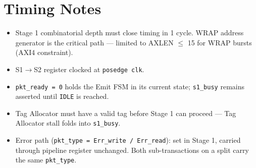 \documentclass[11pt]{article}
\begin{document}
\section{Timing Notes}

\begin{itemize}[noitemsep]
  \item Stage 1 combinatorial depth must close timing in 1 cycle. WRAP address generator is the critical path --- limited to AXLEN $\leq$ 15 for WRAP bursts (AXI4 constraint).
  \item S1$\rightarrow$S2 register clocked at \texttt{posedge clk}.
  \item \texttt{pkt\_ready = 0} holds the Emit FSM in its current state; \texttt{s1\_busy} remains asserted until \texttt{IDLE} is reached.
  \item Tag Allocator must have a valid tag before Stage 1 can proceed --- Tag Allocator stall folds into \texttt{s1\_busy}.
  \item Error path (\texttt{pkt\_type = Err\_write / Err\_read}): set in Stage 1, carried through pipeline register unchanged. Both sub-transactions on a split carry the same \texttt{pkt\_type}.
\end{itemize}
\end{document}

